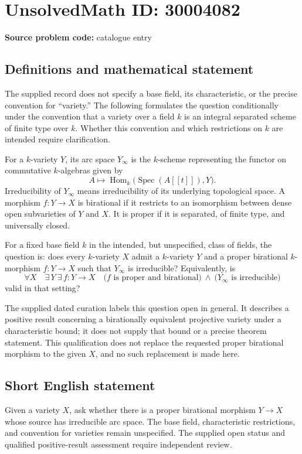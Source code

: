 \documentclass[11pt]{article}
\begin{document}
\section*{UnsolvedMath ID: 30004082}
\textbf{Source problem code:} catalogue entry
\subsection{Definitions and mathematical statement}
The supplied record does not specify a base field, its characteristic, or the precise convention for ``variety.'' The following formulates the question conditionally under the convention that a variety over a field \(k\) is an integral separated scheme of finite type over \(k\). Whether this convention and which restrictions on \(k\) are intended require clarification.

For a \(k\)-variety \(Y\), its arc space \(Y_\infty\) is the \(k\)-scheme representing the functor on commutative \(k\)-algebras given by
\[
 A\longmapsto \operatorname{Hom}_k\bigl(\operatorname{Spec}(A[[t]]),Y\bigr).
\]
Irreducibility of \(Y_\infty\) means irreducibility of its underlying topological space. A morphism \(f:Y\to X\) is birational if it restricts to an isomorphism between dense open subvarieties of \(Y\) and \(X\). It is proper if it is separated, of finite type, and universally closed.

For a fixed base field \(k\) in the intended, but unspecified, class of fields, the question is: does every \(k\)-variety \(X\) admit a \(k\)-variety \(Y\) and a proper birational \(k\)-morphism \(f:Y\to X\) such that \(Y_\infty\) is irreducible? Equivalently, is
\[
 \forall X\quad \exists\,Y\ \exists\,f:Y\to X\quad
 \bigl(f\text{ is proper and birational}\bigr)
 \ \land\ \bigl(Y_\infty\text{ is irreducible}\bigr)
\]
valid in that setting?

The supplied dated curation labels this question open in general. It describes a positive result concerning a birationally equivalent projective variety under a characteristic bound; it does not supply that bound or a precise theorem statement. This qualification does not replace the requested proper birational morphism to the given \(X\), and no such replacement is made here.
\subsection{Short English statement}
Given a variety \(X\), ask whether there is a proper birational morphism \(Y\to X\) whose source has irreducible arc space. The base field, characteristic restrictions, and convention for varieties remain unspecified. The supplied open status and qualified positive-result assessment require independent review.
\end{document}
